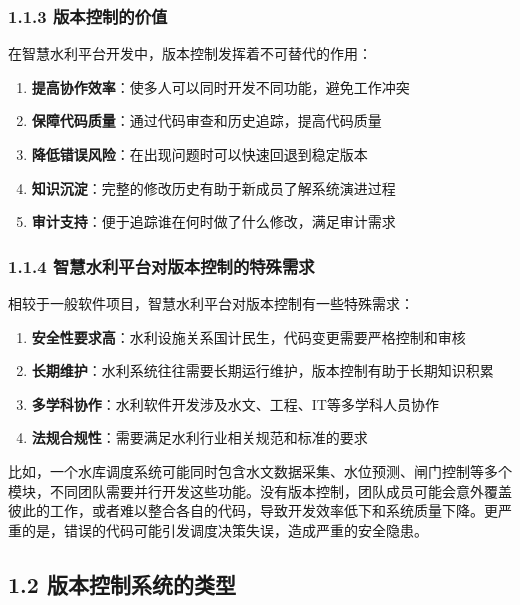 \subsubsection{1.1.3
版本控制的价值}\label{ux7248ux672cux63a7ux5236ux7684ux4ef7ux503c}

在智慧水利平台开发中，版本控制发挥着不可替代的作用：

\begin{enumerate}
\def\labelenumi{\arabic{enumi}.}
\tightlist
\item
  \textbf{提高协作效率}：使多人可以同时开发不同功能，避免工作冲突
\item
  \textbf{保障代码质量}：通过代码审查和历史追踪，提高代码质量
\item
  \textbf{降低错误风险}：在出现问题时可以快速回退到稳定版本
\item
  \textbf{知识沉淀}：完整的修改历史有助于新成员了解系统演进过程
\item
  \textbf{审计支持}：便于追踪谁在何时做了什么修改，满足审计需求
\end{enumerate}

\subsubsection{1.1.4
智慧水利平台对版本控制的特殊需求}\label{ux667aux6167ux6c34ux5229ux5e73ux53f0ux5bf9ux7248ux672cux63a7ux5236ux7684ux7279ux6b8aux9700ux6c42}

相较于一般软件项目，智慧水利平台对版本控制有一些特殊需求：

\begin{enumerate}
\def\labelenumi{\arabic{enumi}.}
\tightlist
\item
  \textbf{安全性要求高}：水利设施关系国计民生，代码变更需要严格控制和审核
\item
  \textbf{长期维护}：水利系统往往需要长期运行维护，版本控制有助于长期知识积累
\item
  \textbf{多学科协作}：水利软件开发涉及水文、工程、IT等多学科人员协作
\item
  \textbf{法规合规性}：需要满足水利行业相关规范和标准的要求
\end{enumerate}

比如，一个水库调度系统可能同时包含水文数据采集、水位预测、闸门控制等多个模块，不同团队需要并行开发这些功能。没有版本控制，团队成员可能会意外覆盖彼此的工作，或者难以整合各自的代码，导致开发效率低下和系统质量下降。更严重的是，错误的代码可能引发调度决策失误，造成严重的安全隐患。

\subsection{1.2
版本控制系统的类型}\label{ux7248ux672cux63a7ux5236ux7cfbux7edfux7684ux7c7bux578b}

